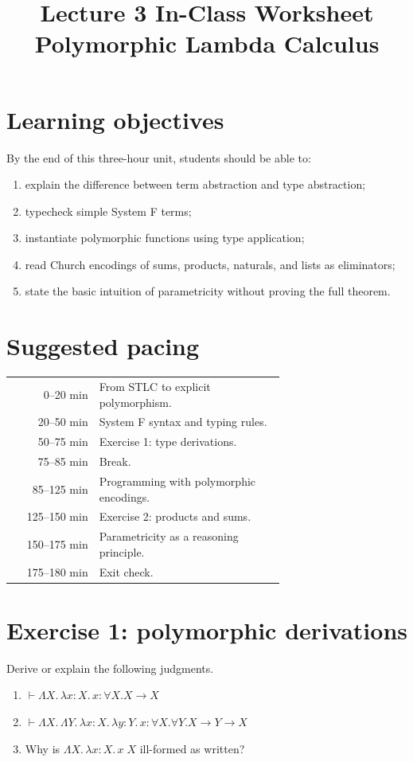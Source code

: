\documentclass[11pt]{article}
\title{Lecture 3 In-Class Worksheet\\Polymorphic Lambda Calculus}
\author{}
\date{}
\newcommand{\lam}[1]{\lambda #1.\,}
\newcommand{\Lam}[1]{\Lambda #1.\,}
\begin{document}
\maketitle

\section*{Learning objectives}
By the end of this three-hour unit, students should be able to:
\begin{enumerate}[nosep]
  \item explain the difference between term abstraction and type abstraction;
  \item typecheck simple System F terms;
  \item instantiate polymorphic functions using type application;
  \item read Church encodings of sums, products, naturals, and lists as eliminators;
  \item state the basic intuition of parametricity without proving the full theorem.
\end{enumerate}

\section*{Suggested pacing}
\begin{center}
\begin{tabular}{r p{0.68\linewidth}}
0--20 min & From STLC to explicit polymorphism.\\
20--50 min & System F syntax and typing rules.\\
50--75 min & Exercise 1: type derivations.\\
75--85 min & Break.\\
85--125 min & Programming with polymorphic encodings.\\
125--150 min & Exercise 2: products and sums.\\
150--175 min & Parametricity as a reasoning principle.\\
175--180 min & Exit check.\\
\end{tabular}
\end{center}

\section*{Exercise 1: polymorphic derivations}
Derive or explain the following judgments.
\begin{enumerate}
  \item $\vdash \Lam{X}\lam{x:X}x : \forall X. X \to X$
  \item $\vdash \Lam{X}\Lam{Y}\lam{x:X}\lam{y:Y}x : \forall X.\forall Y. X \to Y \to X$
  \item Why is $\Lam{X}\lam{x:X}x\;X$ ill-formed as written?
\end{enumerate}
\end{document}
